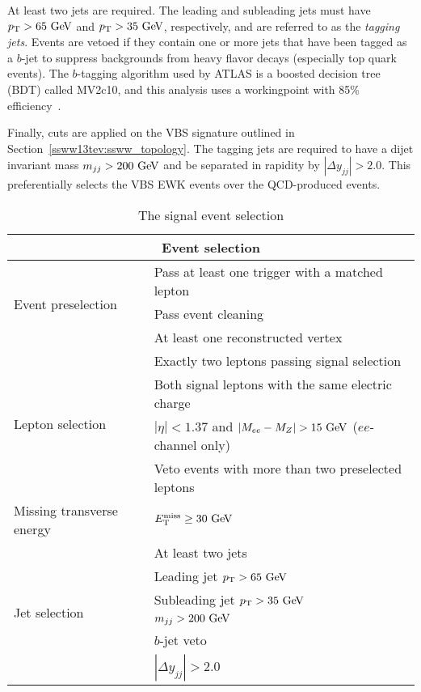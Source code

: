 At least two jets are required.
The leading and subleading jets must have $\pt > 65\gev$ and $\pt > 35\gev$, respectively, and are referred to as the \emph{tagging jets}.
Events are vetoed if they contain one or more jets that have been tagged as a $b$-jet to suppress backgrounds from heavy flavor decays (especially top quark events).
The $b$-tagging algorithm used by ATLAS is a boosted decision tree (BDT) called MV2c10, and this analysis uses a workingpoint with 85\% efficiency~\cite{2018.btag-efficiency-13tev}.

Finally, cuts are applied on the VBS signature outlined in Section~\ref{ssww13tev:ssww_topology}.
The tagging jets are required to have a dijet invariant mass $m_{jj} > 200\gev$ and be separated in rapidity by $|\Delta y_{jj}| > 2.0$.
This preferentially selects the VBS EWK events over the QCD-produced \ssww events.

\begin{table}[htbp]
  \centering
  \begin{tabular}{l | l}
    \multicolumn{2}{c}{Event selection} \\
    \hline\hline
    \multirow{3}{*}{Event preselection} & Pass at least one trigger with a matched lepton \\
                                        & Pass event cleaning \\
                                        & At least one reconstructed vertex\\
    \hline
    \multirow{4}{*}{Lepton selection}   & Exactly two leptons passing signal selection \\
                                        & Both signal leptons with the same electric charge \\
                                        & $|\eta| < 1.37$ and $|M_{ee} - M_Z| > 15\gev$ ($ee$-channel only) \\
                                        & Veto events with more than two preselected leptons \\
    \hline
    Missing transverse energy           & $\met \ge 30\gev$\\
    \hline
    \multirow{6}{*}{Jet selection}      & At least two jets \\
                                        & Leading jet $\pt > 65\gev$ \\
                                        & Subleading jet $\pt > 35\gev$\\
                                        & $m_{jj} > 200\gev$ \\
                                        & $b$-jet veto \\
                                        & $|\Delta y_{jj}| > 2.0$ \\
    \hline
  \end{tabular}
  \caption{The signal event selection}
  \label{tab:ssww13tev_event_selection}
\end{table}
